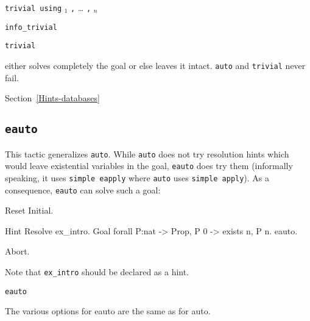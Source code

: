 \begin{coq_example*}
\begin{Variants}
\item \texttt{trivial using} $_1$ {\tt ,} {\ldots} {\tt ,} $_n$

\item {\tt info\_trivial}

\item {\tt {}trivial}  

\end{Variants}

 either solves completely the goal or else leaves it
intact. \texttt{auto} and \texttt{trivial} never fail.

\SeeAlso Section~\ref{Hints-databases}

\subsection{\tt eauto}
\label{eauto}

This tactic generalizes {\tt auto}. While {\tt auto} does not try
resolution hints which would leave existential variables in the goal,
{\tt eauto} does try them (informally speaking, it uses
{\tt simple eapply} where {\tt auto} uses {\tt simple apply}).
As a consequence, {\tt eauto} can solve such a goal:

\begin{coq_eval}
Reset Initial.
\end{coq_eval}
\begin{coq_example}
Hint Resolve ex_intro.
Goal forall P:nat -> Prop, P 0 ->  exists n, P n.
eauto.
\end{coq_example}
\begin{coq_eval}
Abort.
\end{coq_eval}

Note that {\tt ex\_intro} should be declared as a hint.

\begin{Variants}

\item {\tt {}eauto \zeroone{\num}}  

  The various options for eauto are the same as for auto.

\end{Variants}


\end{coq_example*}
